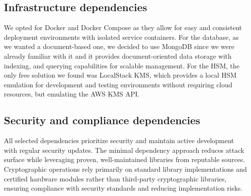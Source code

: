 \subsection{Infrastructure dependencies}

We opted for Docker and Docker Compose as they allow for easy and consistent deployment 
environments with isolated service containers. For the database, as we wanted a document-based one,
we decided to use MongoDB since we were already familiar with it and it provides document-oriented 
data storage with indexing, and querying capabilities for scalable management.
For the HSM, the only free solution we found was LocalStack KMS, which provides a local HSM emulation
for development and testing environments without requiring cloud resources, but emulating the AWS KMS API.

\subsection{Security and compliance dependencies}

All selected dependencies prioritize security and maintain active development 
with regular security updates. The minimal dependency approach reduces attack 
surface while leveraging proven, well-maintained libraries from reputable sources. 
Cryptographic operations rely primarily on standard library implementations 
and certified hardware modules rather than third-party cryptographic libraries, 
ensuring compliance with security standards and reducing implementation risks.